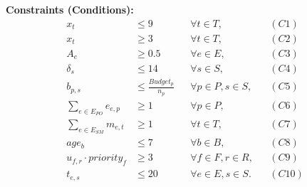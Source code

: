 \documentclass{article}
\begin{document}
\textbf{Constraints (Conditions):}
\begin{align*}
x_t &\le 9 &&\forall t\in T, &&(C1)\\
x_t &\ge 3 &&\forall t\in T, &&(C2)\\
A_e &\ge 0.5 &&\forall e\in E, &&(C3)\\
\delta_s &\le 14 &&\forall s\in S, &&(C4)\\
b_{p,s} &\le \frac{Budget_p}{n_p} &&\forall p\in P,s\in S, &&(C5)\\
\sum_{e\in E_{PO}} e_{e,p} &\ge 1 &&\forall p\in P, &&(C6)\\
\sum_{e\in E_{SM}} m_{e,t} &\ge 1 &&\forall t\in T, &&(C7)\\
age_b &\le 7 &&\forall b\in B, &&(C8)\\
u_{f,r}\cdot priority_f &\ge 3 &&\forall f\in F,r\in R, &&(C9)\\
t_{e,s} &\le 20 &&\forall e\in E,s\in S. &&(C10)
\end{align*}
\end{document}
